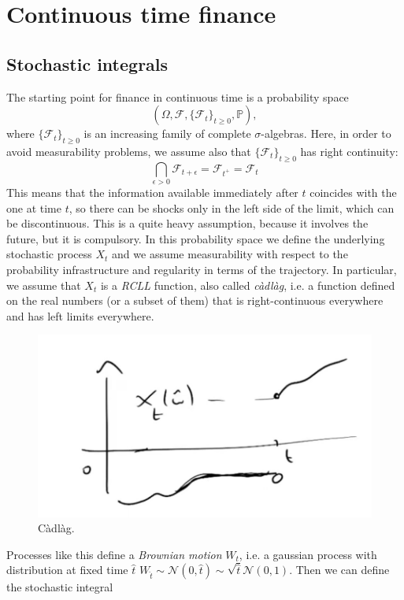\chapter{Continuous time finance}
\section{Stochastic integrals}%
The starting point for finance in continuous time is a probability space $$(\Omega,\mathcal{F},\{\mathcal{F}_t\}_{t\ge0},\mathbb{P}),$$ where $\{\mathcal{F}_t\}_{t\ge0}$ is an increasing family of complete $\sigma$-algebras. Here, in order to avoid measurability problems, we assume also that $\{\mathcal{F}_t\}_{t\ge0}$ has right continuity:
\begin{equation*}
    \bigcap_{\epsilon>0}\mathcal{F}_{t+\epsilon}=\mathcal{F}_{t^+} = \mathcal{F}_t
\end{equation*}
This means that the information available immediately after $t$ coincides with the one at time $t$, so there can be shocks only in the left side of the limit, which can be discontinuous. This is a quite heavy assumption, because it involves the future, but it is compulsory. In this probability space we define the underlying stochastic process $X_t$ and we assume measurability with respect to the probability infrastructure and regularity in terms of the trajectory. In particular, we assume that $X_t$ is a \emph{RCLL} function, also called \emph{càdlàg}, i.e. a function defined on the real numbers (or a subset of them) that is right-continuous everywhere and has left limits everywhere.
\begin{figure}[htp]
    \centering
    \includegraphics[scale=0.3]{fig/tmp/fig9.png}
    \caption{Càdlàg.}
    \label{fig:càdlàg}
\end{figure}
\newline Processes like this define a \emph{Brownian motion} $W_t$, i.e. a gaussian process with distribution at fixed time $\hat{t}$ $W_{\hat{t}}\sim\mathcal{N}(0,\hat{t})\sim\sqrt{\hat{t}}\mathcal{N}(0,1)$. Then we can define the stochastic integral
